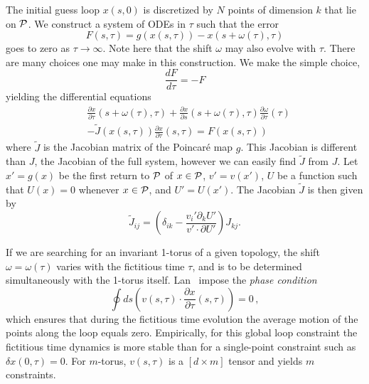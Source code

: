 \documentclass[aip,cha,reprint,
secnumarabic,
nofootinbib, tightenlines,
nobibnotes, showkeys, showpacs,
groupedaddress
]{revtex4-1}
\begin{document}
The initial guess loop $x(s,0)$ is discretized by $N$ points of dimension
$k$ that lie on ${\cal P}$. We construct a system of ODEs in $\tau$ such
that the error
\[
F(s,\tau)=g(x(s,\tau))-x(s+\omega(\tau),\tau)
\]
goes to zero as $\tau \to \infty$.  Note here that the shift $\omega$ may
also evolve with $\tau$.  There are many choices one may make in this
construction.  We make the simple choice,
\[
\frac{dF}{d\tau}=-F
\]
yielding the differential equations
\begin{align}
&\frac{\partial x}{\partial \tau}(s+\omega(\tau),\tau)
+\frac{\partial x}{\partial s}(s+\omega(\tau),\tau)
\frac{\partial \omega}{\partial \tau}(\tau)  \nonumber \\
&-\tilde{J}(x(s,\tau))
\frac{\partial x}{\partial \tau}(s,\tau)=F(x(s,\tau))\nonumber
\end{align}
where $\tilde{J}$ is the Jacobian matrix of the Poincar\'e map $g$.  This
Jacobian is different than $J$, the Jacobian of the full system, however
we can easily find $\tilde{J}$ from $J$.  Let $x'=g(x)$ be the
first return to ${\cal P}$ of $x\in{\cal P}$, $v'=v(x')$, $U$ be a function
such that $U(x)=0$ whenever $x\in{\cal P}$, and $U'=U(x')$.  The Jacobian
$\tilde{J}$ is then given by
\[
\tilde{J}_{ij} = (\delta_{ik}-\frac{v_i' \partial_kU'}{v'\cdot\partial U'})J_{kj}.
\]

If we are
searching for an invariant 1-torus of {a} given topology, the shift
$\omega=\omega(\tau)$ varies
with the fictitious time $\tau$, and
is to be determined simultaneously with the 1-torus itself.
Lan~\etal{} impose the {\em phase condition}
\begin{equation}
\oint ds\!
    \left(
    v(s,\tau)  \cdot \frac{\partial x}{\partial \tau}(s,\tau)
    \right) =0
\,, \label{eq:nonsp1}
\end{equation}
 which ensures that during the fictitious time evolution
the average motion of the points along the
loop  equals zero. Empirically, for  this  global loop
constraint the fictitious time dynamics is more stable than
for a single-point constraint such as $\delta x(0,\tau)=0$.
For $m$-torus, $ v(s,\tau)$ is a $[d \times m]$ tensor and
 yields $m$ constraints.
\end{document}
